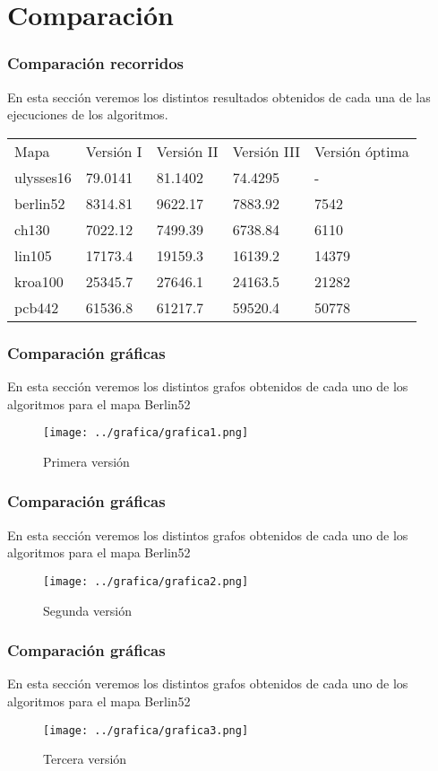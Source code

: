 \documentclass{beamer}
\begin{document}
\section{Comparación}
\begin{frame}
	\frametitle{Comparación recorridos}
	En esta sección veremos los distintos resultados obtenidos de cada una de las ejecuciones de los algoritmos.
	
	\begin{table}[H]
		\centering
	
		
		\begin{tabular}{l|l|l|l|l}
			Mapa & Versión I & Versión II & Versión III  & Versión óptima  \\
			ulysses16 & 79.0141 & 81.1402 & 74.4295 & - \\
			berlin52 & 8314.81 & 9622.17 & 7883.92 & 7542  \\
			ch130 & 7022.12 & 7499.39 & 6738.84 & 6110 \\
			lin105 & 17173.4 & 19159.3 & 16139.2 & 14379 \\
			kroa100	& 25345.7 & 27646.1 & 24163.5 & 21282 \\
			pcb442 & 61536.8 & 61217.7 & 59520.4 & 50778 \\
		\end{tabular}
	
	\end{table}
	
\end{frame}


\begin{frame}
	\frametitle{Comparación gráficas}
	En esta sección veremos los distintos grafos obtenidos de cada uno de los algoritmos para el mapa Berlin52
	
	\begin{figure}
\centering
\texttt{[image: ../grafica/grafica1.png]}
\caption{Primera versión}
\label{fig:graficafinal}
\end{figure}
	
\end{frame}
\begin{frame}
	\frametitle{Comparación gráficas}
	En esta sección veremos los distintos grafos obtenidos de cada uno de los algoritmos para el mapa Berlin52
	
	\begin{figure}
		\centering
		\texttt{[image: ../grafica/grafica2.png]}
		\caption{Segunda versión}
		\label{fig:graficafinal}
	\end{figure}
	
	
	
\end{frame}
\begin{frame}
	\frametitle{Comparación gráficas}
	En esta sección veremos los distintos grafos obtenidos de cada uno de los algoritmos para el mapa Berlin52
	
	\begin{figure}
		\centering
		\texttt{[image: ../grafica/grafica3.png]}
		\caption{Tercera versión}
		\label{fig:graficafinal}
	\end{figure}
	
	
	
\end{frame}
\end{document}
